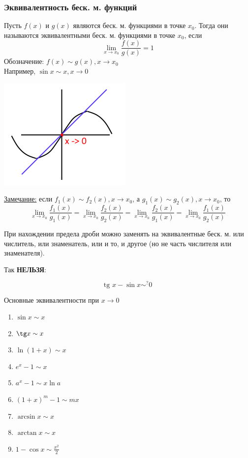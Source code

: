 \documentclass[12pt]{article}
\begin{document}
    \subsubsection*{Эквивалентность беск. м. функций}
    \noindent Пусть $f(x)$ и $g(x)$ являются беск. м. функциями в точке $x_0$. Тогда они называются эквивалентными беск. м. функциями в точке $x_0$, если
    \[ \lim_{x\to x_0}\frac{f(x)}{g(x)} = 1 \]
    Обозначение: $f(x) \sim g(x), x \to x_0$\\
    Например, $\sin x \sim x, x \to 0$
    \begin{center}
        \includegraphics{3.6.1}
    \end{center}
    \underline{Замечание:} если $f_1(x) \sim f_2(x), x \to x_0$, а $g_1(x) \sim g_2(x), x \to x_0$, то
    \[ \lim_{x\to x_0}\frac{f_1(x)}{g_1(x)} = \lim_{x\to x_0}\frac{f_2(x)}{g_2(x)} = \lim_{x\to x_0}\frac{f_2(x)}{g_1(x)} = \lim_{x\to x_0}\frac{f_1(x)}{g_2(x)} \]
    \begin{adjustwidth}{1.5em}{1.5em}
        При нахождении предела дроби можно заменять на эквивалентные беск. м. или числитель, или знаменатель, или и то, и другое (но не часть числителя или знаменателя).
        \begin{center}
            Так \textbf{НЕЛЬЗЯ}:
        \end{center}
        \[ \text{tg } x - \sin x \sim^? 0 \]
    \end{adjustwidth}
    Основные эквивалентности при $x \to 0$
    \begin{enumerate}
        \item $\sin x \sim x$
        \item $\tg x \sim x$
        \item $\ln(1+x) \sim x$
        \item $e^x - 1 \sim x$
        \item $a^x - 1 \sim x \ln a$
        \item $(1+x)^m - 1 \sim mx$
        \item $\arcsin x \sim x$
        \item $\arctan x \sim x$
        \item $1 - \cos x \sim \frac{x^2}{2}$
    \end{enumerate}
\end{document}
